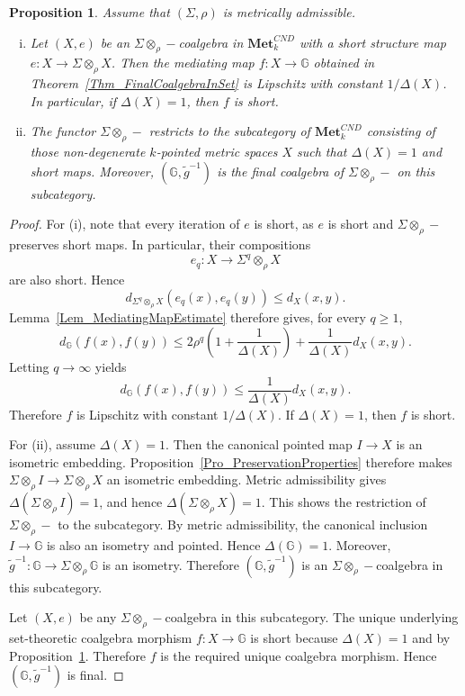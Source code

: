 \documentclass{sn-jnl}%
\theoremstyle{thmstyleone}%
\newtheorem{proposition}[theorem]{Proposition}%
\theoremstyle{thmstyletwo}%
\theoremstyle{thmstylethree}%
\newcommand{\mcnd}{\mathbf{Met}_{k}^{CND}}
\newcommand{\M}{\Sigma}
\newcommand{\Fw}{\M\otimes_{\w}}
\newcommand{\Fwi}[1]{\M^{#1}\otimes_{\w}}
\newcommand{\G}{\mathbb{G}}
\newcommand{\g}{\tilde{g}^{-1}}
\newcommand{\w}{\rho}
\begin{document}
\begin{proposition}
\label{Prop_MediatingMapLipschitz}
    Assume that $(\Sigma,\w)$ is metrically admissible. 
    \begin{enumerate}[(i)]
        \item Let $(X,e)$ be an $\Fw-$coalgebra in $\mcnd$ with a short     structure map $e:X\to \Fw X$. Then the mediating map $f:X\rightarrow \G$ obtained in Theorem~\ref{Thm_FinalCoalgebraInSet} is Lipschitz with constant $1/\Delta(X)$. In particular, if $\Delta(X)=1$, then $f$ is short.
        \item The functor $\Fw-$ restricts to the subcategory of $\mcnd$ consisting of those non-degenerate $k$-pointed metric spaces $X$ such that $\Delta(X)=1$ and short maps. Moreover, $(\G,\g)$ is the final coalgebra of $\Fw-$ on this subcategory.
    \end{enumerate} 
\end{proposition}

\begin{proof}
For (i), note that every iteration of $e$ is short, as $e$ is short and $\Fw-$ preserves short maps. In particular, their compositions 
\begin{equation} 
\nonumber
    e_q:X\longrightarrow \Fwi{q}X
\end{equation}
are also short. Hence
\begin{equation} 
\nonumber
    d_{\Fwi{q}X}(e_q(x),e_q(y))\leq d_X(x,y).
\end{equation}
Lemma~\ref{Lem_MediatingMapEstimate} therefore gives, for every $q\geq1$,
\begin{equation} 
\nonumber
    d_\G(f(x),f(y)) \leq  2\w^q\left(1+\frac{1}{\Delta(X)}\right)  + \frac{1}{\Delta(X)}d_X(x,y).
\end{equation}
Letting $q\to\infty$ yields
\begin{equation} 
\nonumber
    d_\G(f(x),f(y))\leq \frac{1}{\Delta(X)}d_X(x,y).
\end{equation}
Therefore $f$ is Lipschitz with constant $1/\Delta(X)$. If $\Delta(X)=1$, then $f$ is short.

For (ii), assume $\Delta(X)=1$. Then the canonical pointed map $I\rightarrow X$ is an isometric embedding.  Proposition~\ref{Pro_PreservationProperties} therefore makes $\Fw I\rightarrow\Fw X$ an isometric embedding.  Metric admissibility gives $\Delta(\Fw I)=1$, and hence $\Delta(\Fw X)=1$. This shows the restriction of $\Fw-$ to the subcategory. By metric admissibility, the canonical inclusion $I\rightarrow \G$ is also an isometry and pointed. Hence $\Delta(\G)=1$. Moreover, $\g:\G\rightarrow \Fw\G$ is an isometry. Therefore $(\G,\g)$ is an $\Fw-$coalgebra in this subcategory.

Let $(X,e)$ be any $\Fw-$coalgebra in this subcategory. The unique underlying set-theoretic coalgebra morphism $f:X\longrightarrow \G$ is short because $\Delta(X)=1$ and by Proposition~\ref{Prop_MediatingMapLipschitz}. Therefore $f$ is the required unique coalgebra morphism. Hence $(\G,\g)$ is final.
\end{proof}
\end{document}
